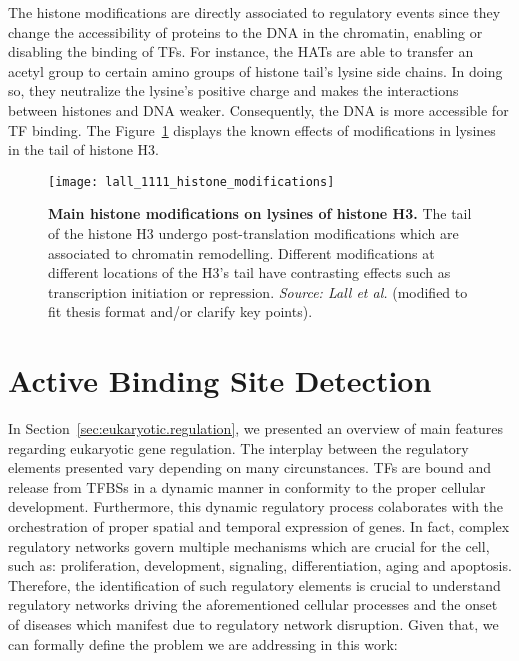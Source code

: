 The histone modifications are directly associated to regulatory events since they change the accessibility of proteins to the DNA in the chromatin, enabling or disabling the binding of TFs. For instance, the HATs are able to transfer an acetyl group to certain amino groups of histone tail's lysine side chains. In doing so, they neutralize the lysine's positive charge and makes the interactions between histones and DNA weaker. Consequently, the DNA is more accessible for TF binding. The Figure~\ref{fig:lall_histone_modifications} displays the known effects of modifications in lysines in the tail of histone H3.

\begin{figure}[h!]
\centering
\texttt{[image: lall\_1111\_histone\_modifications]}
\caption[Main histone modifications on lysines of histone H3]{\textbf{Main histone modifications on lysines of histone H3.} The tail of the histone H3 undergo post-translation modifications which are associated to chromatin remodelling. Different modifications at different locations of the H3's tail have contrasting effects such as transcription initiation or repression. \emph{Source: Lall et al.}\cite{lall2007} (modified to fit thesis format and/or clarify key points).}
\label{fig:lall_histone_modifications}
\end{figure}

\section{Active Binding Site Detection}
\label{sec:active.binding.site.detection}

In Section~\ref{sec:eukaryotic.regulation}, we presented an overview of main features regarding eukaryotic gene regulation. The interplay between the regulatory elements presented vary depending on many circunstances. TFs are bound and release from TFBSs in a dynamic manner in conformity to the proper cellular development. Furthermore, this dynamic regulatory process colaborates with the orchestration of proper spatial and temporal expression of genes. In fact, complex regulatory networks govern multiple mechanisms which are crucial for the cell, such as: proliferation, development, signaling, differentiation, aging and apoptosis. Therefore, the identification of such regulatory elements is crucial to understand regulatory networks driving the aforementioned cellular processes and the onset of diseases which manifest due to regulatory network disruption. Given that, we can formally define the problem we are addressing in this work:

